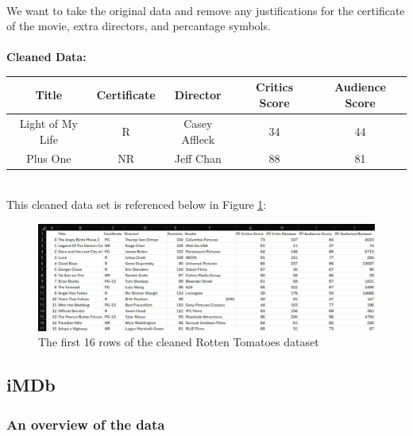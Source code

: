 \documentclass[12pt]{article}
\begin{document}
\qquad \\

\noindent We want to take the original data and remove any justifications for the certificate of the movie, extra directors, and percantage symbols. \\  \\

\noindent \textbf{Cleaned Data:}
\begin{center}
\begin{tabular}{|c|c|c|c|c|} 
\hline
\textbf{Title} & \textbf{Certificate} & \textbf{Director} & \textbf{Critics Score} & \textbf{Audience Score} \\
\hline
Light of My Life & R & Casey Affleck & 34 & 44 \\
\hline
Plus One & NR & Jeff Chan & 88 & 81 \\
\hline
\end{tabular}
\end{center}

\qquad \\

\noindent This cleaned data set is referenced below in Figure \ref{Figure 2}: \\

\begin{figure}[h]
\begin{center}
      \includegraphics[width=6in]{figure2.png}
      \caption{The first 16 rows of the cleaned Rotten Tomatoes dataset}
      \label{Figure 2}
\end{center}
\end{figure}

\newpage



\subsection{iMDb}
\subsubsection{An overview of the data}
\end{document}
